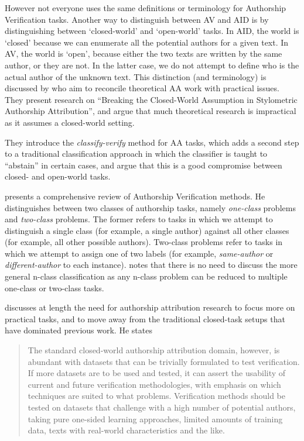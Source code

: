 However not everyone uses the same definitions or terminology for Authorship Verification tasks.  Another way to distinguish between AV and AID is by distinguishing between `closed-world' and `open-world' tasks. In AID, the world is `closed' because we can enumerate all the potential authors for a given text. In AV, the world is `open', because either the two texts are written by the same author, or they are not. In the latter case, we do not attempt to define who is the actual author of the unknown text. This distinction (and terminology) is discussed by \citet{stolerman2011classify} who aim to reconcile theoretical AA work with practical issues. They present research on ``Breaking the Closed-World Assumption in Stylometric Authorship Attribution'', and argue that much theoretical research is impractical as it assumes a closed-world setting.

They introduce the \textit{classify-verify} method for AA tasks, which adds a second step to a traditional classification approach in which the classifier is taught to ``abstain'' in certain cases, and argue that this is a good compromise between closed- and open-world tasks.

\citet{stolerman2015authorship} presents a comprehensive review of Authorship Verification methods. He distinguishes between two classes of authorship tasks, namely \textit{one-class} problems and \textit{two-class} problems. The former refers to tasks in which we attempt to distinguish a single class (for example, a single author) against all other classes (for example, all other possible authors). Two-class problems refer to tasks in which we attempt to assign one of two labels (for example, \textit{same-author} or \textit{different-author} to each instance). \citeauthor{stolerman2015authorship} notes that there is no need to discuss the more general n-class classification as any n-class problem can be reduced to multiple one-class or two-class tasks.

\citeauthor{stolerman2015authorship} discusses at length the need for authorship attribution research to focus more on practical tasks, and to move away from the traditional closed-task setups that have dominated previous work. He states

\begin{quote}
The standard closed-world authorship attribution domain, however, is abundant with datasets that can be trivially formulated to test verification. If more datasets are to be used and tested, it can assert the usability of current and future verification methodologies, with emphasis on which techniques are suited to what problems. Verification methods should be tested on datasets that challenge with a high number of potential authors, taking pure one-sided learning approaches, limited amounts of training data, texts with real-world characteristics and the like.   
\end{quote}

